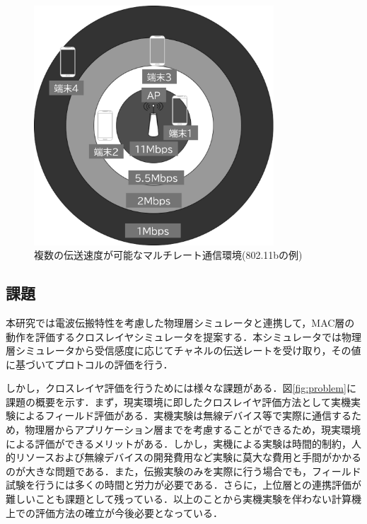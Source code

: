 \documentclass[a4paper,10pt]{ltjsarticle}
\begin{document}
\begin{figure}[H]
  \centering
  \includegraphics[width=0.8\textwidth]{./assets/multilate.png}
  \caption{複数の伝送速度が可能なマルチレート通信環境(802.11bの例)}
  \label{multirate}
\end{figure}

\clearpage

\subsection{課題}
本研究では電波伝搬特性を考慮した物理層シミュレータと連携して，MAC層の動作を評価するクロスレイヤシミュレータを提案する．本シミュレータでは物理層シミュレータから受信感度に応じてチャネルの伝送レートを受け取り，その値に基づいてプロトコルの評価を行う．

しかし，クロスレイヤ評価を行うためには様々な課題がある．図\ref{fig:problem}に課題の概要を示す．まず，現実環境に即したクロスレイヤ評価方法として実機実験によるフィールド評価がある．実機実験は無線デバイス等で実際に通信するため，物理層からアプリケーション層までを考慮することができるため，現実環境による評価ができるメリットがある．しかし，実機による実験は時間的制約，人的リソースおよび無線デバイスの開発費用など実験に莫大な費用と手間がかかるのが大きな問題である．また，伝搬実験のみを実際に行う場合でも，フィールド試験を行うには多くの時間と労力が必要である．さらに，上位層との連携評価が難しいことも課題として残っている．以上のことから実機実験を伴わない計算機上での評価方法の確立が今後必要となっている\cite{book2}．
\end{document}

